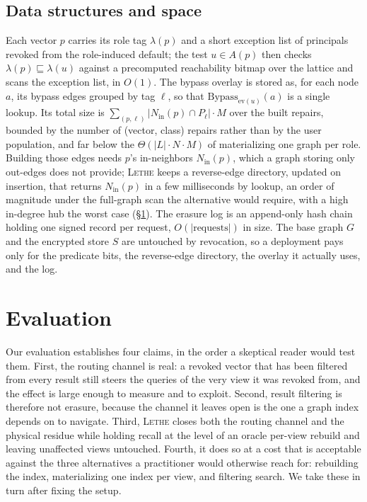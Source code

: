 \documentclass[sigconf, nonacm, review]{acmart}
\newcommand{\Nin}{N_{\mathrm{in}}}
\begin{document}
\subsection{Data structures and space}
\label{sec:ds}

Each vector $p$ carries its role tag $\lambda(p)$ and a short exception list
of principals revoked from the role-induced default; the test $u\in A(p)$
then checks $\lambda(p)\sqsubseteq\lambda(u)$ against a precomputed
reachability bitmap over the lattice and scans the exception list, in
$O(1)$. The bypass overlay is stored as, for each node $a$, its bypass
edges grouped by tag $\ell$, so that $\mathrm{Bypass}_{\mathrm{ev}(u)}(a)$ is a
single lookup. Its total size is $\sum_{(p,\ell)}|\Nin(p)\cap P_\ell|\cdot M$
over the built repairs, bounded by the number of (vector, class) repairs
rather than by the user population, and far below the
$\Theta(|L|\cdot N\cdot M)$ of materializing one graph per role. Building those edges needs $p$'s
in-neighbors $\Nin(p)$, which a graph storing only out-edges does not
provide; \textsc{Lethe} keeps a reverse-edge directory, updated on insertion, that
returns $\Nin(p)$ in a few milliseconds by lookup, an order of magnitude
under the full-graph scan the alternative would require, with a high
in-degree hub the worst case (\S\ref{sec:eval}). The erasure
log is an append-only hash chain holding one signed record per request,
$O(|\text{requests}|)$ in size. The base graph $G$ and the encrypted store
$S$ are untouched by revocation, so a deployment pays only for the predicate
bits, the reverse-edge directory, the overlay it actually uses, and the log.

\section{Evaluation}
\label{sec:eval}

Our evaluation establishes four claims, in the order a skeptical reader
would test them. First, the routing channel is real: a revoked vector that
has been filtered from every result still steers the queries of the very
view it was revoked from, and the effect is large enough to measure and to
exploit. Second, result filtering is therefore not erasure, because the
channel it leaves open is the one a graph index depends on to navigate.
Third, \textsc{Lethe} closes both the routing channel and the physical
residue while holding recall at the level of an oracle per-view rebuild and
leaving unaffected views untouched. Fourth, it does so at a cost that is
acceptable against the three alternatives a practitioner would otherwise
reach for: rebuilding the index, materializing one index per view, and
filtering search. We take these in turn after fixing the setup.
\end{document}

